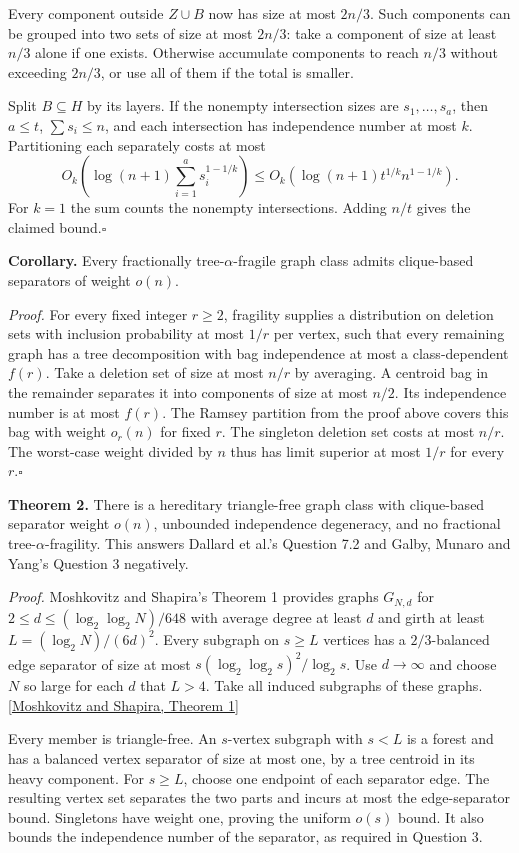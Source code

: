 \documentclass[11pt]{article}
\newcommand{\done}{\hfill\(\square\)}
\begin{document}
Every component outside $Z\cup B$ now has size at most $2n/3$. Such components can be grouped into two sets of size at most $2n/3$: take a component of size at least $n/3$ alone if one exists. Otherwise accumulate components to reach $n/3$ without exceeding $2n/3$, or use all of them if the total is smaller.

Split $B\subseteq H$ by its layers. If the nonempty intersection sizes are $s_1,\ldots,s_a$, then $a\le t$, $\sum s_i\le n$, and each intersection has independence number at most $k$. Partitioning each separately costs at most
\[
 O_k\!\left(\log(n+1)\sum_{i=1}^a s_i^{1-1/k}\right)
       \le O_k\!\left(\log(n+1)t^{1/k}n^{1-1/k}\right).
\]
For $k=1$ the sum counts the nonempty intersections. Adding $n/t$ gives the claimed bound.\done

\textbf{Corollary.} Every fractionally tree-$\alpha$-fragile graph class admits clique-based separators of weight $o(n)$.

\textit{Proof.} For every fixed integer $r\ge2$, fragility supplies a distribution on deletion sets with inclusion probability at most $1/r$ per vertex, such that every remaining graph has a tree decomposition with bag independence at most a class-dependent $f(r)$. Take a deletion set of size at most $n/r$ by averaging. A centroid bag in the remainder separates it into components of size at most $n/2$. Its independence number is at most $f(r)$. The Ramsey partition from the proof above covers this bag with weight $o_r(n)$ for fixed $r$. The singleton deletion set costs at most $n/r$. The worst-case weight divided by $n$ thus has limit superior at most $1/r$ for every $r$.\done

\textbf{Theorem 2.} There is a hereditary triangle-free graph class with clique-based separator weight $o(n)$, unbounded independence degeneracy, and no fractional tree-$\alpha$-fragility. This answers Dallard et al.'s Question 7.2 and Galby, Munaro and Yang's Question 3 negatively.

\textit{Proof.} Moshkovitz and Shapira's Theorem 1 provides graphs $G_{N,d}$ for $2\le d\le(\log_2\log_2 N)/648$ with average degree at least $d$ and girth at least $L=(\log_2 N)/(6d)^2$. Every subgraph on $s\ge L$ vertices has a $2/3$-balanced edge separator of size at most $s(\log_2\log_2 s)^2/\log_2 s$. Use $d\to\infty$ and choose $N$ so large for each $d$ that $L>4$. Take all induced subgraphs of these graphs. [\href{https://arxiv.org/abs/1502.00409}{Moshkovitz and Shapira, Theorem 1}]

Every member is triangle-free. An $s$-vertex subgraph with $s<L$ is a forest and has a balanced vertex separator of size at most one, by a tree centroid in its heavy component. For $s\ge L$, choose one endpoint of each separator edge. The resulting vertex set separates the two parts and incurs at most the edge-separator bound. Singletons have weight one, proving the uniform $o(s)$ bound. It also bounds the independence number of the separator, as required in Question 3.
\end{document}
